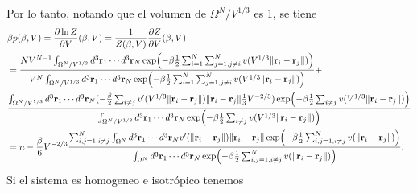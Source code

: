 \documentclass{article}
\begin{document}
Por lo tanto, notando que el volumen de $\Omega^N/V^{1/3}$ es 1, se tiene
\begin{align}
\begin{split}
&\beta p(\beta,V) =\frac{\partial \ln{Z}}{\partial V}(\beta,V)=\frac{1}{Z(\beta,V)}\frac{\partial Z}{\partial V}(\beta, V)\\
&=\frac{NV^{N-1}\int_{\Omega^N/V^{1/3}}d^3\vb{r}_1\cdots d^3\vb{r}_N\exp(-\beta\frac{1}{2}\sum_{i=1}^N\sum_{j=1,j\neq i}^Nv(V^{1/3}\|\vb{r}_i-\vb{r}_j\|))}{V^N\int_{\Omega^N/V^{1/3}}d^3\vb{r}_1\cdots d^3\vb{r}_N\exp(-\beta\frac{1}{2}\sum_{i=1}^N\sum_{j=1,j\neq i}^Nv(V^{1/3}\|\vb{r}_i-\vb{r}_j\|))}+\\
&\frac{\int_{\Omega^N/V^{1/3}}d^3\vb{r}_1\cdots d^3\vb{r}_N(-\frac{\beta}{2}\sum_{i\neq j}v'(V^{1/3}\|\vb{r}_i-\vb{r}_j\|)\|\vb{r}_i-\vb{r}_j\|\frac{1}{3}V^{-2/3})\exp(-\beta\frac{1}{2}\sum_{i\neq j}v(V^{1/3}\|\vb{r}_i-\vb{r}_j\|))}{\int_{\Omega^N/V^{1/3}}d^3\vb{r}_1\cdots d^3\vb{r}_N\exp(-\beta\frac{1}{2}\sum_{i\neq j}v(V^{1/3}\|\vb{r}_i-\vb{r}_j\|))}\\
&= n-\frac{\beta}{6}V^{-2/3}\frac{\sum_{i,j=1,i\neq j}^N\int_{\Omega^N}d^3\vb{r}_1\cdots d^3\vb{r}_Nv'(\|\vb{r}_i-\vb{r}_j\|)\|\vb{r}_i-\vb{r}_j\|\exp(-\beta\frac{1}{2}\sum_{i,j=1,i\neq j}^Nv(\|\vb{r}_i-\vb{r}_j\|))}{\int_{\Omega^N}d^3\vb{r}_1\cdots d^3\vb{r}_N\exp(-\beta\frac{1}{2}\sum_{i,j=1,i\neq j}^Nv(\|\vb{r}_i-\vb{r}_j\|))}.
\end{split}
\end{align}
Si el sistema es homogeneo e isotrópico tenemos 
\end{document}
